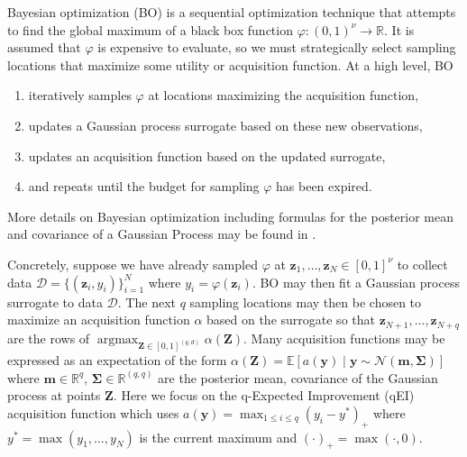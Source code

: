 \documentclass[graybox]{svmult}
\begin{document}
Bayesian optimization (BO) is a sequential optimization technique that attempts to find the global maximum of a black box function $\varphi: (0,1)^{\nu} \to \mathbb{R}$. It is assumed that $\varphi$ is expensive to evaluate, so we must strategically select sampling locations that maximize some utility or acquisition function. At a high level, BO 
\begin{enumerate}
    \item iteratively samples $\varphi$ at locations maximizing the acquisition function,
    \item updates a Gaussian process surrogate based on these new observations,
    \item updates an acquisition function based on the updated surrogate,
    \item and repeats until the budget for sampling $\varphi$ has been expired.
\end{enumerate}
More details on Bayesian optimization including formulas for the posterior mean and covariance of a Gaussian Process may be found in \cite{frazier2018tutorial}.

Concretely, suppose we have already sampled $\varphi$ at $\boldsymbol{z}_1,\dots,\boldsymbol{z}_{N} \in [0,1]^{\nu}$ to collect data $\mathcal{D}=\{(\boldsymbol{z}_i,y_i)\}_{i=1}^N$ where $y_i = \varphi(\boldsymbol{z}_i)$. BO may then fit a Gaussian process surrogate to data $\mathcal{D}$. The next $q$ sampling locations may then be chosen to maximize an acquisition function $\alpha$ based on the surrogate so that $\boldsymbol{z}_{N+1}, \dots, \boldsymbol{z}_{N+q}$ are the rows of $\mathop{\text{argmax}}_{\boldsymbol{Z} \in [0,1]^{(q,d)}}\alpha(\boldsymbol{Z})$. Many acquisition functions may be expressed as an expectation of the form $\alpha(\boldsymbol{Z}) = \mathbb{E}\left[a(\boldsymbol{y}) \mid \boldsymbol{y} \sim \mathcal{N}\left(\boldsymbol{m},\boldsymbol{\Sigma}\right)\right]$ where $\boldsymbol{m} \in \mathbb{R}^{q}$, $\boldsymbol{\Sigma} \in \mathbb{R}^{(q, q)}$ are the posterior mean, covariance of the Gaussian process at points $\boldsymbol{Z}$. Here we focus on the q-Expected Improvement (qEI) acquisition function which uses $a(\boldsymbol{y}) = \max_{1 \leq i \leq q} (y_i - y^*)_+$ where $y^*= \max\left(y_1,\dots,y_N\right)$ is the current maximum and $(\cdot)_+ = \max(\cdot,0)$. 
\end{document}
